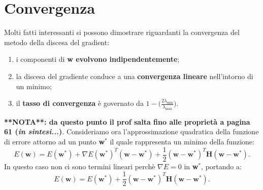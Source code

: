 \section{Convergenza}
Molti fatti interessanti si possono dimostrare  riguardanti la convergenza del metodo della discesa del gradient:
\begin{enumerate}
    \item i componenti di \textbf{w evolvono indipendentemente};
    \item la discesa del gradiente conduce a una \textbf{convergenza lineare} nell'intorno di un minimo;
    \item il \textbf{tasso di convergenza} è governato da $1-\Big( \frac{2\lambda_{\text{min}}}{\lambda_{\text{max}}} \Big)$.
\end{enumerate}
\textbf{**NOTA**: da questo punto il prof salta fino alle proprietà a pagina 61 (\textit{in sintesi...})}.
\newline
\newline
Consideriamo ora l'approssimazione quadratica della funzione di errore attorno ad un punto \textbf{w}$^*$ il quale rappresenta un minimo della funzione:
\begin{equation}
    E(\textbf{w})=E(\textbf{w}^*)+\nabla E(\textbf{w}^*)^T(\textbf{w}-\textbf{w}^*)+\frac{1}{2}(\textbf{w}-\textbf{w}^*)^T\textbf{H}(\textbf{w}-\textbf{w}^*).
\end{equation}
In questo caso non ci sono termini lineari perchè $\nabla E=0$ in \textbf{w}$^*$, portando a:
\begin{equation}
    E(\textbf{w})=E(\textbf{w}^*)+\frac{1}{2}(\textbf{w}-\textbf{w}^*)^T\textbf{H}(\textbf{w}-\textbf{w}^*).
\end{equation}

